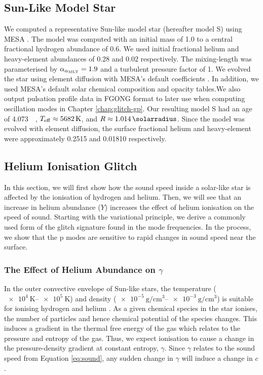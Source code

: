 \subsection{Sun-Like Model Star}\label{sec:model-s}

We computed a representative Sun-like model star (hereafter model S) using MESA \citep[version 12115;][]{Paxton.Bildsten.ea2011,Paxton.Cantiello.ea2013,Paxton.Marchant.ea2015,Paxton.Schwab.ea2018,Paxton.Smolec.ea2019,Jermyn.Bauer.ea2023}. The model was computed with an initial mass of \SI{1.0}{\solarmass} to a central fractional hydrogen abundance of 0.6. We used initial fractional helium and heavy-element abundances of 0.28 and 0.02 respectively. The mixing-length was parameterised by \(\alpha_{{\alpha_\mathrm{MLT}}}=1.9\) and a turbulent pressure factor of 1. We evolved the star using element diffusion with MESA's default coefficients \citep{Stanton.Murillo2016}. In addition, we used MESA's default \citet{Grevesse.Sauval1998} solar chemical composition and opacity tables.We also output pulsation profile data in FGONG format to later use when computing oscillation modes in Chapter \ref{chap:glitch-gp}. Our resulting model S had an age of \SI{4.073}{\giga\year}, \({T_\mathrm{eff}} \approx \SI{5682}{\kelvin}\), and \(R \approx \SI{1.014}{\solarradius}\). Since the model was evolved with element diffusion, the surface fractional helium and heavy-element were approximately \num{0.2515} and \num{0.01810} respectively.

\subsection{Helium Ionisation Glitch}\label{sec:helium-glitch}

In this section, we will first show how the sound speed inside a solar-like star is affected by the ionisation of hydrogen and helium. Then, we will see that an increase in helium abundance (\(Y\)) increases the effect of helium ionisation on the speed of sound. Starting with the variational principle, we derive a commonly used form of the glitch signature found in the mode frequencies. In the process, we show that the p modes are sensitive to rapid changes in sound speed near the surface.

\subsubsection{The Effect of Helium Abundance on \(\gamma\)}

In the outer convective envelope of Sun-like stars, the temperature (\(\SIrange{e4}{e5}{\kelvin}\)) and density (\(\SIrange{e-5}{e-3}{\gram\per\centi\metre\cubed}\)) is suitable for ionising hydrogen and helium \citep{Eggleton.Faulkner.ea1973}. As a given chemical species in the star ionises, the number of particles and hence chemical potential of the species changes. This induces a gradient in the thermal free energy of the gas which relates to the pressure and entropy of the gas. Thus, we expect ionisation to cause a change in the pressure-density gradient at constant entropy, \(\gamma\). Since \(\gamma\) relates to the sound speed from Equation \ref{eq:sound}, any sudden change in \(\gamma\) will induce a change in \(c\).


